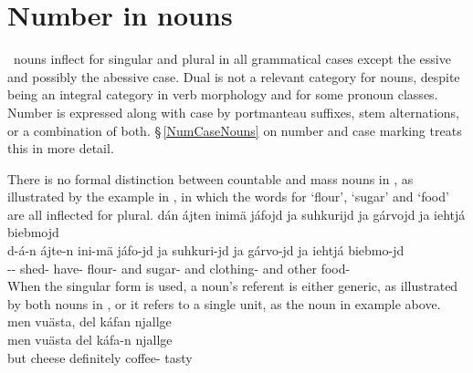 \section{Number in nouns}\label{numberNouns}
\PS\ nouns inflect for singular and plural in all grammatical cases except the essive and possibly the abessive case. Dual is not a relevant category for nouns, despite being an integral category in verb morphology %
and for some pronoun classes. Number is expressed along with case by portmanteau suffixes, stem alternations, or a combination of both. %
§\,\ref{NumCaseNouns} on number and case marking %
treats this in more detail.

There is no formal distinction between countable and mass nouns in \PS, as illustrated by the example in , in which the words for ‘flour’, ‘sugar’ and ‘food’ are all inflected for plural. %
\ea\label{uncountableEx1}
\glll	dán ájten inimä jáfojd ja suhkurijd ja gárvojd ja iehtjá biebmojd\\
	d-á-n ájte-n ini-mä jáfo-jd ja suhkuri-jd ja gárvo-jd ja iehtjá biebmo-jd\\
	-- shed- have- flour- and sugar- and clothing- and other food-\\\nopagebreak
{}	
\z
When the singular form is used, a noun’s referent is either generic, as illustrated by both nouns in , or it refers to a single unit, %
as the noun  in example  above. 
\ea\label{uncountableEx2}
\glll	men vuästa, del káfan njallge\\
	men vuästa del káfa-n njallge\\
	but cheese\BS{} definitely coffee- tasty\\\nopagebreak
{}	
\z


